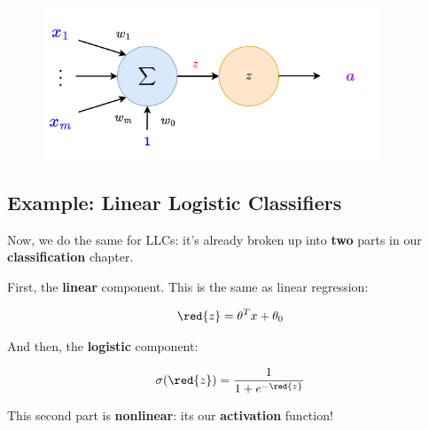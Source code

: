         \begin{figure}[H]
            \centering
            \includegraphics[width=100mm,scale=0.4]{images/nn_images/linear_reg.png}
        \end{figure}
    
    \subsection{Example: Linear Logistic Classifiers}
    
        Now, we do the same for LLCs: it's already broken up into \textbf{two} parts in our \textbf{classification} chapter.
        
        First, the \textbf{linear} component. This is the same as linear regression:
        
        \begin{equation}
            \red{z} = 
            \theta^T x + \theta_0
        \end{equation}
        
        And then, the \textbf{logistic} component:
        
        \begin{equation}
            \sigma(\red{z}) = \frac{1}{1+e^{-\red{z}}}
        \end{equation}
        
        This second part is \textbf{nonlinear}: its our \textbf{activation} function!\\
        
